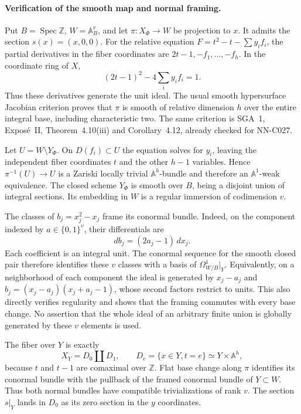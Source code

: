 \paragraph{Verification of the smooth map and normal framing.}
Put $B=\operatorname{Spec}\mathbb Z$, $W=\mathbb A^v_B$, and let
$\pi:X_\Phi\to W$ be projection to $x$. It admits the section
$s(x)=(x,0,0)$. For the relative equation
$F=t^2-t-\sum y_i f_i$, the partial derivatives in the fiber
coordinates are $2t-1,-f_1,\ldots,-f_h$. In the coordinate ring of $X$,
\[
                   (2t-1)^2-4\sum_i y_i f_i=1.
\]
Thus these derivatives generate the unit ideal. The usual smooth
hypersurface Jacobian criterion proves that $\pi$ is smooth of relative
dimension $h$ over the entire integral base, including characteristic
two. The same criterion is SGA~1, Expos\'e~II, Theorem~4.10(iii) and
Corollary~4.12, already checked for NN-C027.

Let $U=W\setminus Y_\Phi$. On $D(f_i)\subset U$ the equation solves
for $y_i$, leaving the independent fiber coordinates $t$ and the other
$h-1$ variables. Hence $\pi^{-1}(U)\to U$ is a Zariski locally trivial
$\mathbb A^h$-bundle and therefore an $\mathbb A^1$-weak equivalence.
The closed scheme $Y_\Phi$ is smooth over $B$, being a disjoint union of
integral sections. Its embedding in $W$ is a regular immersion of
codimension $v$.

The classes of $b_j=x_j^2-x_j$ frame its conormal bundle. Indeed, on
the component indexed by $a\in\{0,1\}^v$, their differentials are
\[
                  db_j=(2a_j-1)\,dx_j.
\]
Each coefficient is an integral unit. The conormal sequence for the
smooth closed pair therefore identifies these $v$ classes with a basis
of $\Omega^1_{W/B}|_Y$. Equivalently, on a neighborhood of each component
the ideal is generated by $x_j-a_j$ and $b_j=(x_j-a_j)(x_j+a_j-1)$,
whose second factors restrict to units. This also directly verifies
regularity and shows that the framing commutes with every base change.
No assertion that the whole ideal of an arbitrary finite union is
globally generated by these $v$ elements is used.

The fiber over $Y$ is exactly
\[
 X_Y=D_0\amalg D_1,\qquad D_e=\{x\in Y,t=e\}\simeq Y\times\mathbb A^h,
\]
because $t$ and $t-1$ are comaximal over $\mathbb Z$. Flat base change
along $\pi$ identifies its conormal bundle with the pullback of the
framed conormal bundle of $Y\subset W$. Thus both normal bundles have
compatible trivializations of rank $v$. The section $s|_Y$ lands in
$D_0$ as its zero section in the $y$ coordinates.

